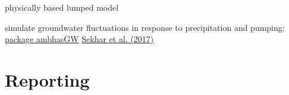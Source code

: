 \documentclass[9pt,ignorenonframetext,]{beamer}
\newcommand{\columnsend}{\end{columns}}
\begin{document}

\begin{frame}{physically based lumped model}

simulate groundwater fluctuations in response to precipitation and
pumping: \href{https://cran.r-project.org/package=ambhasGW}{package
ambhasGW} \href{www.mdpi.com/2071-1050/10/1/26/pdf}{Sekhar et al.
(2017)}

\end{frame}

\section{Reporting}\label{reporting}
\end{document}
